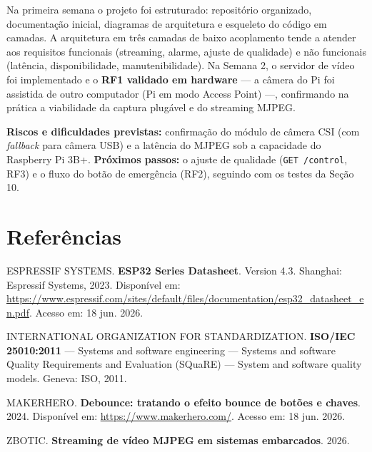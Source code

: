 \documentclass[12pt,a4paper]{article}
\begin{document}
Na primeira semana o projeto foi estruturado: repositório organizado,
documentação inicial, diagramas de arquitetura e esqueleto do código em camadas.
A arquitetura em três camadas de baixo acoplamento tende a atender aos requisitos
funcionais (streaming, alarme, ajuste de qualidade) e não funcionais (latência,
disponibilidade, manutenibilidade). Na Semana 2, o servidor de vídeo foi
implementado e o \textbf{RF1 validado em hardware} — a câmera do Pi foi assistida
de outro computador (Pi em modo Access Point) —, confirmando na prática a
viabilidade da captura plugável e do streaming MJPEG.

\textbf{Riscos e dificuldades previstas:} confirmação do módulo de câmera CSI
(com \textit{fallback} para câmera USB) e a latência do MJPEG sob a capacidade do
Raspberry Pi 3B+. \textbf{Próximos passos:} o ajuste de qualidade
(\texttt{GET /control}, RF3) e o fluxo do botão de emergência (RF2), seguindo com
os testes da Seção 10.

\section*{Referências}

\begingroup
\setlength{\parskip}{0.7em}

ESPRESSIF SYSTEMS. \textbf{ESP32 Series Datasheet}. Version 4.3. Shanghai:
Espressif Systems, 2023. Disponível em:
\url{https://www.espressif.com/sites/default/files/documentation/esp32_datasheet_en.pdf}.
Acesso em: 18 jun. 2026.

INTERNATIONAL ORGANIZATION FOR STANDARDIZATION. \textbf{ISO/IEC 25010:2011} —
Systems and software engineering — Systems and software Quality Requirements and
Evaluation (SQuaRE) — System and software quality models. Geneva: ISO, 2011.

MAKERHERO. \textbf{Debounce: tratando o efeito bounce de botões e chaves}. 2024.
Disponível em: \url{https://www.makerhero.com/}. Acesso em: 18 jun. 2026.

ZBOTIC. \textbf{Streaming de vídeo MJPEG em sistemas embarcados}. 2026.
\endgroup
\end{document}
